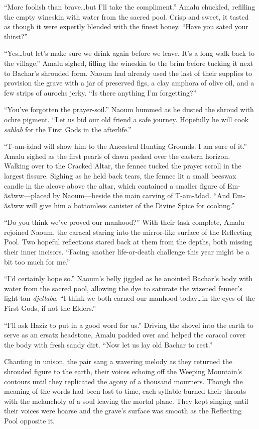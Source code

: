 ``More foolish than brave\ldots but I'll take the compliment.'' Amalu chuckled, refilling the empty wineskin with water from the sacred pool. Crisp and sweet, it tasted as though it were expertly blended with the finest honey. ``Have you sated your thirst?''

``Yes\ldots but let's make sure we drink again before we leave. It's a long walk back to the village.'' Amalu sighed, filling the wineskin to the brim before tucking it next to Bachar's shrouded form. Naoum had already used the last of their supplies to provision the grave with a jar of preserved figs, a clay amphora of olive oil, and a few strips of aurochs jerky. ``Is there anything I'm forgetting?''

``You've forgotten the prayer-soil.'' Naoum hummed as he dusted the shroud with ochre pigment. ``Let us bid our old friend a safe journey. Hopefully he will cook \emph{sahlab} for the First Gods in the afterlife.''

``T-am-ădad will show him to the Ancestral Hunting Grounds. I am sure of it.'' Amalu sighed as the first pearls of dawn peeked over the eastern horizon. Walking over to the Cracked Altar, the fennec tucked the prayer scroll in the largest fissure. Sighing as he held back tears, the fennec lit a small beeswax candle in the alcove above the altar, which contained a smaller figure of Em-ăsăww---placed by Naoum---beside the main carving of T-am-ădad. ``And Em-ăsăww will give him a bottomless canister of the Divine Spice for cooking.''

``Do you think we've proved our manhood?'' With their task complete, Amalu rejoined Naoum, the caracal staring into the mirror-like surface of the Reflecting Pool. Two hopeful reflections stared back at them from the depths, both missing their inner incisors. ``Facing another life-or-death challenge this year might be a bit too much for me.''

``I'd certainly hope so.'' Naoum's belly jiggled as he anointed Bachar's body with water from the sacred pool, allowing the dye to saturate the wizened fennec's light tan \emph{djellaba}. ``I think we both earned our manhood today\ldots in the eyes of the First Gods, if not the Elders.''

``I'll ask Haziz to put in a good word for us.'' Driving the shovel into the earth to serve as an ersatz headstone, Amalu padded over and helped the caracal cover the body with fresh sandy dirt. ``Now let us lay old Bachar to rest.''

Chanting in unison, the pair sang a wavering melody as they returned the shrouded figure to the earth, their voices echoing off the Weeping Mountain's contours until they replicated the agony of a thousand mourners. Though the meaning of the words had been lost to time, each syllable burned their throats with the melancholy of a soul leaving the mortal plane. They kept singing until their voices were hoarse and the grave's surface was smooth as the Reflecting Pool opposite it.


